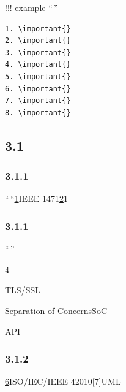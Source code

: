 !!! example ``\,''

\begin{verbatim}
1. \important{}
2. \important{}
3. \important{}
4. \important{}
5. \important{}
6. \important{}
7. \important{}
8. \important{}
\end{verbatim}

\hypertarget{section-5}{%
\subsection{3.1}\label{section-5}}

\hypertarget{section-6}{%
\subsubsection{3.1.1}\label{section-6}}

``\,``\protect\hyperlink{section-17}{1}IEEE
1471\protect\hyperlink{section-34}{2}1

\hypertarget{section-7}{%
\subsubsection{3.1.1}\label{section-7}}

``\,''


\important{}\protect\hyperlink{section-18}{4}

\important{}

\important{}TLS/SSL


\important{}

\important{}

\important{}Separation of ConcernsSoC


\important{}

\important{}API

\important{}


\important{}

\important{}

\important{}

\hypertarget{section-8}{%
\subsubsection{3.1.2}\label{section-8}}

\protect\hyperlink{section-19}{6}ISO/IEC/IEEE 42010{[}7{]}UML

